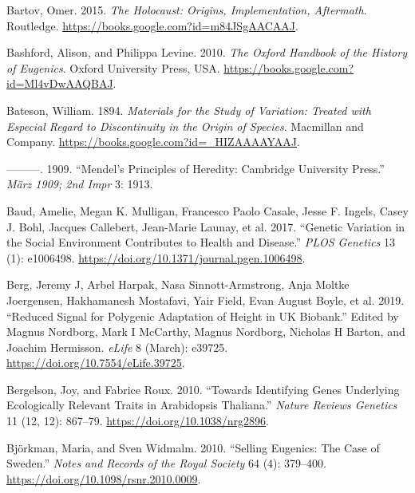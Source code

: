 \documentclass[
]{book}
\newlength{\cslhangindent}
\newlength{\cslentryspacingunit} %
\newenvironment{CSLReferences}[2] %
 {%
  \setlength{\parindent}{0pt}
  \ifodd #1
  \let\oldpar\par
  \def\par{\hangindent=\cslhangindent\oldpar}
  \fi
  \setlength{\parskip}{#2\cslentryspacingunit}
 }%
 {}
\begin{document}
\begin{CSLReferences}{1}{0}
\leavevmode{}%
Bartov, Omer. 2015. \emph{The {Holocaust}: {Origins}, {Implementation}, {Aftermath}}. {Routledge}. \url{https://books.google.com?id=m84JSgAACAAJ}.

\leavevmode{}%
Bashford, Alison, and Philippa Levine. 2010. \emph{The {Oxford Handbook} of the {History} of {Eugenics}}. {Oxford University Press, USA}. \url{https://books.google.com?id=Ml4vDwAAQBAJ}.

\leavevmode{}%
Bateson, William. 1894. \emph{Materials for the {Study} of {Variation}: {Treated} with {Especial Regard} to {Discontinuity} in the {Origin} of {Species}}. {Macmillan and Company}. \url{https://books.google.com?id=_HIZAAAAYAAJ}.

\leavevmode{}%
---------. 1909. {``Mendel's {Principles} of {Heredity}: {Cambridge University Press}.''} \emph{März 1909; 2nd Impr} 3: 1913.

\leavevmode{}%
Baud, Amelie, Megan K. Mulligan, Francesco Paolo Casale, Jesse F. Ingels, Casey J. Bohl, Jacques Callebert, Jean-Marie Launay, et al. 2017. {``Genetic {Variation} in the {Social Environment Contributes} to {Health} and {Disease}.''} \emph{PLOS Genetics} 13 (1): e1006498. \url{https://doi.org/10.1371/journal.pgen.1006498}.

\leavevmode{}%
Berg, Jeremy J, Arbel Harpak, Nasa Sinnott-Armstrong, Anja Moltke Joergensen, Hakhamanesh Mostafavi, Yair Field, Evan August Boyle, et al. 2019. {``Reduced Signal for Polygenic Adaptation of Height in {UK Biobank}.''} Edited by Magnus Nordborg, Mark I McCarthy, Magnus Nordborg, Nicholas H Barton, and Joachim Hermisson. \emph{eLife} 8 (March): e39725. \url{https://doi.org/10.7554/eLife.39725}.

\leavevmode{}%
Bergelson, Joy, and Fabrice Roux. 2010. {``Towards Identifying Genes Underlying Ecologically Relevant Traits in {Arabidopsis} Thaliana.''} \emph{Nature Reviews Genetics} 11 (12, 12): 867--79. \url{https://doi.org/10.1038/nrg2896}.

\leavevmode{}%
Björkman, Maria, and Sven Widmalm. 2010. {``Selling Eugenics: The Case of {Sweden}.''} \emph{Notes and Records of the Royal Society} 64 (4): 379--400. \url{https://doi.org/10.1098/rsnr.2010.0009}.


\end{CSLReferences}
\end{document}
